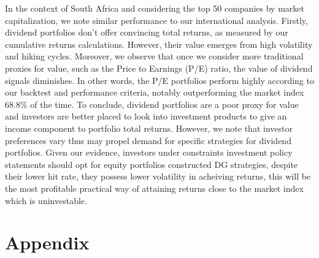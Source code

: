 \documentclass[11pt,preprint, authoryear]{elsarticle}
\numberwithin{equation}{section}
\numberwithin{figure}{section}
\numberwithin{table}{section}
\begin{document}
In the context of South Africa and considering the top 50 companies by
market capitalization, we note similar performance to our international
analysis. Firstly, dividend portfolios don't offer convincing total
returns, as measured by our cumulative returns calculations. However,
their value emerges from high volatility and hiking cycles. Moreover, we
observe that once we consider more traditional proxies for value, such
as the Price to Earnings (P/E) ratio, the value of dividend signals
diminishes. In other words, the P/E portfolios perform highly according
to our backtest and performance criteria, notably outperforming the
market index 68.8\% of the time. To conclude, dividend portfolios are a
poor proxy for value and investors are better placed to look into
investment products to give an income component to portfolio total
returns. However, we note that investor preferences vary thus may propel
demand for specific strategies for dividend portfolios. Given our
evidence, investors under constraints investment policy statements
should opt for equity portfolios constructed DG strategies, despite
their lower hit rate, they possess lower volatility in acheiving
returns, this will be the most profitable practical way of attaining
returns close to the market index which is uninvestable.

\newpage

\hypertarget{appendix}{%
\section*{Appendix}\label{appendix}}
\end{document}
